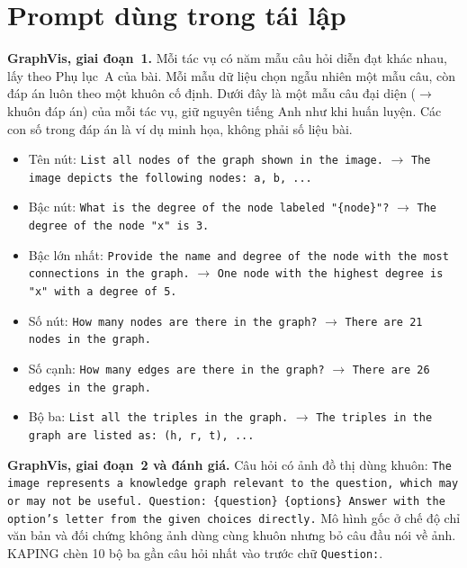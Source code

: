 \section{Prompt dùng trong tái lập}\label{app:prompts}
\textbf{GraphVis, giai đoạn~1.} Mỗi tác vụ có năm mẫu câu hỏi diễn đạt khác nhau, lấy theo Phụ lục~A của bài. Mỗi mẫu dữ liệu chọn ngẫu nhiên một mẫu câu, còn đáp án luôn theo một khuôn cố định. Dưới đây là một mẫu câu đại diện ($\rightarrow$ khuôn đáp án) của mỗi tác vụ, giữ nguyên tiếng Anh như khi huấn luyện. Các con số trong đáp án là ví dụ minh họa, không phải số liệu bài.
\begin{itemize}\footnotesize
\item Tên nút: \texttt{List all nodes of the graph shown in the image.} $\rightarrow$ \texttt{The image depicts the following nodes: a, b, ...}
\item Bậc nút: \texttt{What is the degree of the node labeled "\{node\}"?} $\rightarrow$ \texttt{The degree of the node "x" is 3.}
\item Bậc lớn nhất: \texttt{Provide the name and degree of the node with the most connections in the graph.} $\rightarrow$ \texttt{One node with the highest degree is "x" with a degree of 5.}
\item Số nút: \texttt{How many nodes are there in the graph?} $\rightarrow$ \texttt{There are 21 nodes in the graph.}
\item Số cạnh: \texttt{How many edges are there in the graph?} $\rightarrow$ \texttt{There are 26 edges in the graph.}
\item Bộ ba: \texttt{List all the triples in the graph.} $\rightarrow$ \texttt{The triples in the graph are listed as: (h, r, t), ...}
\end{itemize}

\textbf{GraphVis, giai đoạn~2 và đánh giá.} Câu hỏi có ảnh đồ thị dùng khuôn: \texttt{The image represents a knowledge graph relevant to the question, which may or may not be useful. Question: \{question\} \{options\} Answer with the option's letter from the given choices directly.} Mô hình gốc ở chế độ chỉ văn bản và đối chứng không ảnh dùng cùng khuôn nhưng bỏ câu đầu nói về ảnh. KAPING chèn 10 bộ ba gần câu hỏi nhất vào trước chữ \texttt{Question:}.


